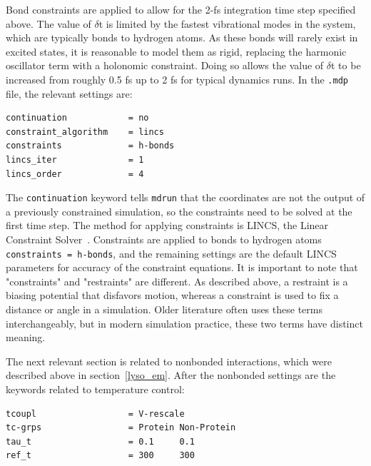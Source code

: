 \documentclass[9pt,tutorial]{livecoms}
\begin{document}
Bond constraints are applied to allow for the 2-fs integration time step specified above. The value of $\delta$t is limited by the fastest vibrational modes in the system, which are typically bonds to hydrogen atoms. As these bonds will rarely exist in excited states, it is reasonable to model them as rigid, replacing the harmonic oscillator term with a holonomic constraint. Doing so allows the value of $\delta$t to be increased from roughly 0.5 fs up to 2 fs for typical dynamics runs. In the \texttt{.mdp} file, the relevant settings are:

\begin{verbatim}
continuation            = no
constraint_algorithm    = lincs
constraints             = h-bonds
lincs_iter              = 1
lincs_order             = 4
\end{verbatim}

The \texttt{continuation} keyword tells \texttt{mdrun} that the coordinates are not the output of a previously constrained simulation, so the constraints need to be solved at the first time step. The method for applying constraints is LINCS, the Linear Constraint Solver~\cite{Hess1997,Hess2008b}. Constraints are applied to bonds to hydrogen atoms \texttt{constraints = h-bonds}, and the remaining settings are the default LINCS parameters for accuracy of the constraint equations. It is important to note that "constraints" and "restraints" are different. As described above, a restraint is a biasing potential that disfavors motion, whereas a constraint is used to fix a distance or angle in a simulation. Older literature often uses these terms interchangeably, but in modern simulation practice, these two terms have distinct meaning.

The next relevant section is related to nonbonded interactions, which were described above in section~\ref{lyso_em}. After the nonbonded settings are the keywords related to temperature control:

\begin{verbatim}
tcoupl                  = V-rescale
tc-grps                 = Protein Non-Protein
tau_t                   = 0.1     0.1
ref_t                   = 300     300
\end{verbatim}
\end{document}
